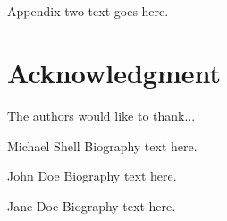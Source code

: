 \documentclass[journal]{IEEEtran}
\begin{document}
\section{}
Appendix two text goes here.

\section*{Acknowledgment}


The authors would like to thank...

\ifCLASSOPTIONcaptionsoff
  \newpage
\fi





\begin{IEEEbiography}{Michael Shell}
Biography text here.
\end{IEEEbiography}

\begin{IEEEbiographynophoto}{John Doe}
Biography text here.
\end{IEEEbiographynophoto}

\begin{IEEEbiographynophoto}{Jane Doe}
Biography text here.
\end{IEEEbiographynophoto}
\end{document}

